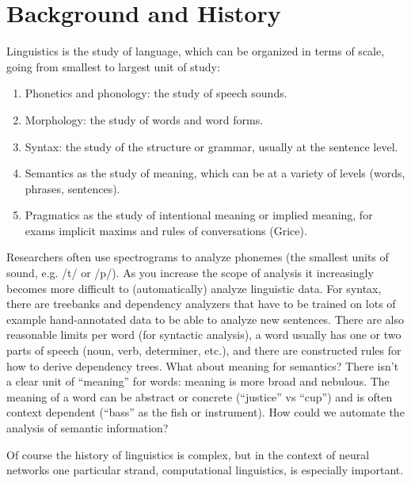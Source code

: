 \section{Background and History}

Linguistics is the study of language, which can be organized in terms of scale, going from smallest to largest unit of study: 
\begin{enumerate}
\item Phonetics and phonology: the study of speech sounds.
\item Morphology: the study of words and word forms.
\item Syntax: the study of the structure or grammar, usually at the sentence level.
\item Semantics as the study of meaning, which can be at a variety of levels (words, phrases, sentences).
\item Pragmatics as the study of intentional meaning or implied meaning, for exams implicit maxims and rules of conversations (Grice). 
\end{enumerate}

Researchers often use spectrograms to analyze phonemes (the smallest units of sound, e.g. /t/ or /p/). As you increase the scope of analysis it increasingly becomes more difficult to (automatically) analyze linguistic data. For syntax, there are treebanks and dependency analyzers that have to be trained on lots of example hand-annotated data to be able to analyze new sentences. There are also reasonable limits per word (for syntactic analysis), a word usually has one or two parts of speech (noun, verb, determiner, etc.), and there are constructed rules for how to derive dependency trees. What about meaning for semantics? There isn't a clear unit of ``meaning'' for words: meaning is more broad and nebulous. The meaning of a word can be abstract or concrete (``justice'' vs ``cup'') and is often context dependent (``bass'' as the fish or instrument). How could we automate the analysis of semantic information?

Of course the history of linguistics is complex, but in the context of neural networks one particular strand, computational linguistics, is especially important. 


